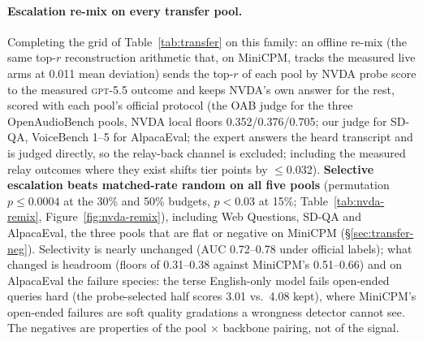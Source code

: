 \paragraph{Escalation re-mix on every transfer pool.} Completing the
grid of Table~\ref{tab:transfer} on this family: an offline re-mix
(the same top-$r$ reconstruction arithmetic that, on MiniCPM, tracks
the measured live arms at 0.011 mean deviation) sends the
top-$r$ of each pool by NVDA probe score to the measured
\textsc{gpt-5.5} outcome and keeps NVDA's own answer for the rest,
scored with each pool's official protocol (the OAB judge for the
three OpenAudioBench pools, NVDA local floors 0.352/0.376/0.705;
our judge for SD-QA, VoiceBench 1--5 for AlpacaEval; the expert
answers the heard transcript and is judged directly, so the
relay-back channel is excluded; including the measured relay
outcomes where they exist shifts tier points by $\le$0.032).
\textbf{Selective escalation beats matched-rate random on all five
pools} (permutation $p\le0.0004$ at the 30\% and 50\% budgets,
$p<0.03$ at 15\%; Table~\ref{tab:nvda-remix},
Figure~\ref{fig:nvda-remix}), including Web Questions, SD-QA and
AlpacaEval, the three pools that are flat or negative on MiniCPM
(\S\ref{sec:transfer-neg}). Selectivity is nearly unchanged (AUC
0.72--0.78 under official labels); what changed is headroom (floors
of 0.31--0.38 against MiniCPM's 0.51--0.66) and on AlpacaEval the
failure species: the terse English-only model fails open-ended
queries hard (the probe-selected half scores 3.01 vs.\ 4.08
kept), where MiniCPM's open-ended failures are soft quality
gradations a wrongness detector cannot see. The negatives are
properties of the pool $\times$ backbone pairing, not of the signal.


